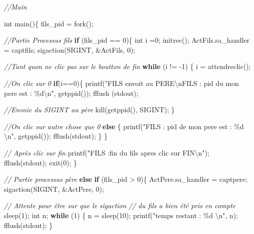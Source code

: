 \documentclass[
]{article}
\newenvironment{Shaded}{}{}
\newcommand{\CommentTok}[1]{\textcolor[rgb]{0.38,0.63,0.69}{\textit{#1}}}
\newcommand{\ControlFlowTok}[1]{\textcolor[rgb]{0.00,0.44,0.13}{\textbf{#1}}}
\newcommand{\DataTypeTok}[1]{\textcolor[rgb]{0.56,0.13,0.00}{#1}}
\newcommand{\DecValTok}[1]{\textcolor[rgb]{0.25,0.63,0.44}{#1}}
\newcommand{\NormalTok}[1]{#1}
\newcommand{\SpecialCharTok}[1]{\textcolor[rgb]{0.25,0.44,0.63}{#1}}
\newcommand{\StringTok}[1]{\textcolor[rgb]{0.25,0.44,0.63}{#1}}
\begin{document}
\begin{Shaded}
\begin{Highlighting}[]
\CommentTok{//Main}

\DataTypeTok{int}\NormalTok{ main()\{}
\NormalTok{    fils\_pid = fork();}
    
    \CommentTok{//Partie Processus fils}
    \ControlFlowTok{if}\NormalTok{ (fils\_pid == }\DecValTok{0}\NormalTok{)\{}
    \DataTypeTok{int}\NormalTok{ i =}\DecValTok{0}\NormalTok{;}
\NormalTok{        initrec();}
\NormalTok{        ActFils.sa\_handler = captfils;}
\NormalTok{        sigaction(SIGINT, \&ActFils, }\DecValTok{0}\NormalTok{);}
        
        \CommentTok{//Tant qu\textquotesingle{}on ne clic pas sur le boutton de fin}
        \ControlFlowTok{while}\NormalTok{ (i != {-}}\DecValTok{1}\NormalTok{)}
\NormalTok{        \{}
\NormalTok{            i = attendreclic();}
            
            \CommentTok{//On clic sur 0}
            \ControlFlowTok{if}\NormalTok{(i==}\DecValTok{0}\NormalTok{)\{}
\NormalTok{                printf(}\StringTok{"FILS envoit au PERE}\SpecialCharTok{\textbackslash{}n}\StringTok{FILS :  pid du mon pere est : \%d}\SpecialCharTok{\textbackslash{}n}\StringTok{"}\NormalTok{, getppid());}
\NormalTok{                fflush (stdout);}
            
            \CommentTok{//Envoie du SIGINT au père}
\NormalTok{                kill(getppid(), SIGINT);}
\NormalTok{            \}}
            
            \CommentTok{//On clic sur autre chose que 0}
            \ControlFlowTok{else}\NormalTok{ \{}
\NormalTok{            printf(}\StringTok{"FILS :  pid de mon pere est : \%d }\SpecialCharTok{\textbackslash{}n}\StringTok{"}\NormalTok{, getppid());}
\NormalTok{            fflush(stdout);}
\NormalTok{            \}}
\NormalTok{        \}}
        
        \CommentTok{// Après clic sur fin }
\NormalTok{    printf(}\StringTok{"FILS :fin du fils apres clic sur FIN}\SpecialCharTok{\textbackslash{}n}\StringTok{"}\NormalTok{);}
\NormalTok{    fflush(stdout);}
\NormalTok{    exit(}\DecValTok{0}\NormalTok{);}
\NormalTok{    \} }
    
    \CommentTok{// Partie processus père}
    \ControlFlowTok{else} \ControlFlowTok{if}\NormalTok{ (fils\_pid \textgreater{} }\DecValTok{0}\NormalTok{)\{}
\NormalTok{        ActPere.sa\_handler = captpere;}
\NormalTok{        sigaction(SIGINT, \&ActPere, }\DecValTok{0}\NormalTok{);}
        
        \CommentTok{// Attente pour être sur que le sigaction }
        \CommentTok{// du fils a bien été pris en compte}
\NormalTok{        sleep(}\DecValTok{1}\NormalTok{);}
        \DataTypeTok{int}\NormalTok{ n;}
        \ControlFlowTok{while}\NormalTok{ (}\DecValTok{1}\NormalTok{)}
\NormalTok{        \{}
\NormalTok{            n = sleep(}\DecValTok{10}\NormalTok{);}
\NormalTok{            printf(}\StringTok{"temps restant : \%d }\SpecialCharTok{\textbackslash{}n}\StringTok{"}\NormalTok{, n);}
\NormalTok{            fflush(stdout);}
\NormalTok{        \}}
        

\end{Highlighting}
\end{Shaded}
\end{document}

